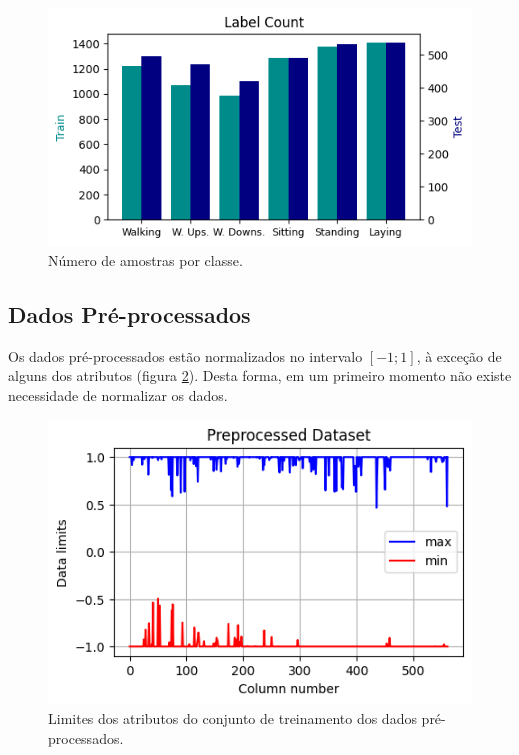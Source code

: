 \documentclass[final,5p]{elsarticle}
\numberwithin{equation}{section}
\begin{document}
        \begin{figure}[hbt!]
            \includegraphics[width=0.95\columnwidth]{A_LabelCount.png}
            \caption{Número de amostras por classe.}
            \label{fig:numero_por_classe}
        \end{figure}

    \subsection{Dados Pré-processados}
        Os dados pré-processados estão normalizados no intervalo $[-1;1]$, à exceção de alguns dos atributos (figura \ref{fig:dados_preprocessados}). Desta forma, em um primeiro momento não existe necessidade de normalizar os dados.

        \begin{figure}[hbt!]
            \includegraphics[width=0.95\columnwidth]{A_Dataset_Scale.png}
            \caption{Limites dos atributos do conjunto de treinamento dos dados pré-processados.}
            \label{fig:dados_preprocessados}
        \end{figure}
\end{document}
